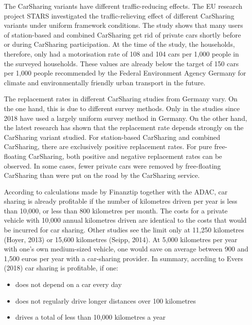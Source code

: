 \documentclass[
]{book}
\providecommand{\tightlist}{%
  \setlength{\itemsep}{0pt}\setlength{\parskip}{0pt}}
\begin{document}
The CarSharing variants have different traffic-reducing effects. The EU research project STARS investigated the traffic-relieving effect of different CarSharing variants under uniform framework conditions. The study shows that many users of station-based and combined CarSharing get rid of private cars shortly before or during CarSharing participation. At the time of the study, the households, therefore, only had a motorisation rate of 108 and 104 cars per 1,000 people in the surveyed households. These values are already below the target of 150 cars per 1,000 people recommended by the Federal Environment Agency Germany for climate and environmentally friendly urban transport in the future.

The replacement rates in different CarSharing studies from Germany vary. On the one hand, this is due to different survey methods. Only in the studies since 2018 have used a largely uniform survey method in Germany. On the other hand, the latest research has shown that the replacement rate depends strongly on the CarSharing variant studied. For station-based CarSharing and combined CarSharing, there are exclusively positive replacement rates. For pure free-floating CarSharing, both positive and negative replacement rates can be observed. In some cases, fewer private cars were removed by free-floating CarSharing than were put on the road by the CarSharing service.

According to calculations made by Finanztip together with the ADAC, car sharing is already profitable if the number of kilometres driven per year is less than 10,000, or less than 800 kilometres per month. The costs for a private vehicle with 10,000 annual kilometres driven are identical to the costs that would be incurred for car sharing. Other studies see the limit only at 11,250 kilometres (Hoyer, 2013) or 15,600 kilometres (Seipp, 2014). At 5,000 kilometres per year with one's own medium-sized vehicle, one would save on average between 900 and 1,500 euros per year with a car-sharing provider.
In summary, accrding to Evers (2018) car sharing is profitable, if one:

\begin{itemize}
\tightlist
\item
  does not depend on a car every day
\item
  does not regularly drive longer distances over 100 kilometres
\item
  drives a total of less than 10,000 kilometres a year
\end{itemize}
\end{document}

